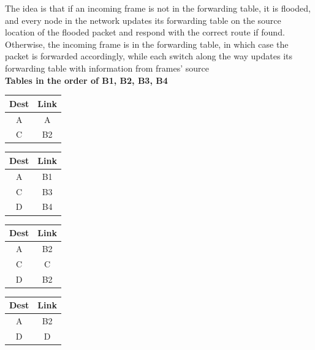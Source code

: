 \documentclass[11pt]{article}
\begin{document}
\begin{solution}
    The idea is that if an incoming frame is not in the forwarding table, it is flooded, and every node in the network updates its forwarding table on the source location of the flooded packet and respond with the correct route if found. Otherwise, the incoming frame is in the forwarding table, in which case the packet is forwarded accordingly, while each switch along the way updates its forwarding table with information from frames' source  \\ 
    \textbf{Tables in the order of B1, B2, B3, B4}
    \begin{center}
        \begin{tabular}{ |c|c| } 
            Dest & Link \\ 
            \hline  
            A & A  \\ 
            C & B2 \\ 
        \end{tabular}
        \begin{tabular}{ |c|c| } 
            Dest & Link \\ 
            \hline  
            A & B1 \\ 
            C & B3 \\  
            D & B4 \\ 
        \end{tabular}
        \begin{tabular}{ |c|c| } 
            Dest & Link \\ 
            \hline  
            A & B2  \\
            C & C   \\ 
            D & B2 \\ 
        \end{tabular}
        \begin{tabular}{ |c|c| } 
            Dest & Link \\ 
            \hline  
            A & B2  \\
            D & D   \\ 
        \end{tabular}
    \end{center}
\end{solution}
\end{document}
